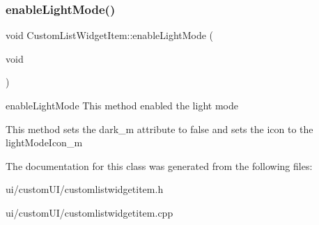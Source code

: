 \subsubsection{\texorpdfstring{enable\+Light\+Mode()}{enableLightMode()}}
{\footnotesize\ttfamily void Custom\+List\+Widget\+Item\+::enable\+Light\+Mode (\begin{DoxyParamCaption}\item[{void}]{ }\end{DoxyParamCaption})}



enable\+Light\+Mode This method enabled the light mode 

This method sets the dark\+\_\+m attribute to false and sets the icon to the light\+Mode\+Icon\+\_\+m 

The documentation for this class was generated from the following files\+:\begin{DoxyCompactItemize}
\item 
ui/custom\+U\+I/customlistwidgetitem.\+h\item 
ui/custom\+U\+I/customlistwidgetitem.\+cpp\end{DoxyCompactItemize}
